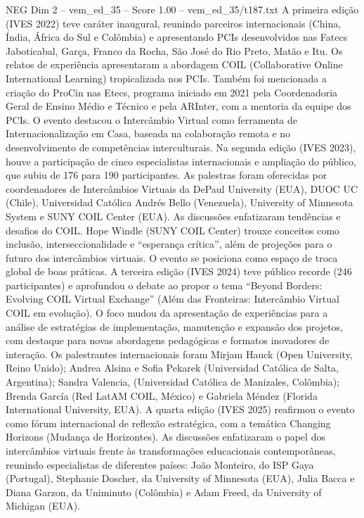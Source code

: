 \begin{textsample}{NEG Dim 2 – vem\_ed\_35 – Score 1.00 – vem\_ed\_35/t187.txt}
A primeira edição (IVES 2022) teve caráter inaugural, reunindo parceiros internacionais (China, Índia, África do Sul e Colômbia) e apresentando PCIs desenvolvidos nas Fatecs Jaboticabal, Garça, Franco da Rocha, São José do Rio Preto, Matão e Itu.
Os relatos de experiência apresentaram a abordagem COIL (Collaborative Online International Learning) tropicalizada nos PCIs.
Também foi mencionada a criação do ProCin nas Etecs, programa iniciado em 2021 pela Coordenadoria Geral de Ensino Médio e Técnico e pela ARInter, com a mentoria da equipe dos PCIs.
O evento destacou o Intercâmbio Virtual como ferramenta de Internacionalização em Casa, baseada na colaboração remota e no desenvolvimento de competências interculturais.
Na segunda edição (IVES 2023), houve a participação de cinco especialistas internacionais e ampliação do público, que subiu de 176 para 190 participantes.
As palestras foram oferecidas por coordenadores de Intercâmbios Virtuais da DePaul University (EUA), DUOC UC (Chile), Universidad Católica Andrés Bello (Venezuela), University of Minnesota System e SUNY COIL Center (EUA).
As discussões enfatizaram tendências e desafios do COIL.
Hope Windle (SUNY COIL Center) trouxe conceitos como inclusão, interseccionalidade e “esperança crítica”, além de projeções para o futuro dos intercâmbios virtuais.
O evento se posiciona como espaço de troca global de boas práticas.
A terceira edição (IVES 2024) teve público recorde (246 participantes) e aprofundou o debate ao propor o tema “Beyond Borders: Evolving COIL Virtual Exchange” (Além das Fronteiras: Intercâmbio Virtual COIL em evolução).
O foco mudou da apresentação de experiências para a análise de estratégias de implementação, manutenção e expansão dos projetos, com destaque para novas abordagens pedagógicas e formatos inovadores de interação.
Os palestrantes internacionais foram Mirjam Hauck (Open University, Reino Unido); Andrea Alsina e Sofia Pekarek (Universidad Católica de Salta, Argentina); Sandra Valencia, (Universidad Católica de Manizales, Colômbia); Brenda García (Red LatAM COIL, México) e Gabriela Méndez (Florida International University, EUA).
A quarta edição (IVES 2025) reafirmou o evento como fórum internacional de reflexão estratégica, com a temática Changing Horizons (Mudança de Horizontes).
As discussões enfatizaram o papel dos intercâmbios virtuais frente às transformações educacionais contemporâneas, reunindo especialistas de diferentes países: João Monteiro, do ISP Gaya (Portugal), Stephanie Doscher, da University of Minnesota (EUA), Julia Bacca e Diana Garzon, da Uniminuto (Colômbia) e Adam Freed, da University of Michigan (EUA).

\end{textsample}
